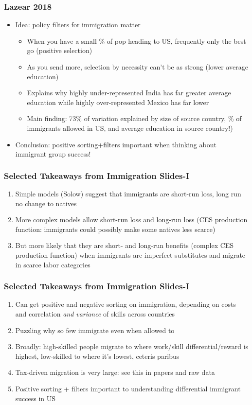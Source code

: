 \documentclass{beamer}
\begin{document}
\begin{frame}
\frametitle{Lazear 2018}
\begin{itemize}
\item Idea: policy filters for immigration matter 
\bigskip
\begin{itemize}
\item When you have a small \% of pop heading to US, frequently only the best go (positive selection)
\bigskip
\item As you send more, selection by necessity can't be as strong (lower average education)
\bigskip
\item Explains why highly under-represented India has far greater average education while highly over-represented Mexico has far lower 
\bigskip
\item Main finding: 73\% of variation explained by size of source country, \% of immigrants allowed in US, and average education in source country!)
\end{itemize}
\item Conclusion:  positive sorting+filters important when thinking about immigrant group success!
\end{itemize}
\end{frame}




\begin{frame}
\frametitle{Selected Takeaways from Immigration Slides-I}
\begin{enumerate}
\item Simple models (Solow) suggest that immigrants are short-run loss, long run no change to natives
\item More complex models allow short-run loss and long-run loss (CES production function: immigrants could possibly make some natives less scarce)
\item But more likely that they are short- and long-run benefits (complex CES production function) when immigrants are imperfect substitutes and migrate in scarce labor categories
\end{enumerate}
\end{frame}

\begin{frame}
\frametitle{Selected Takeaways from Immigration Slides-I}
\begin{enumerate}
\item Can get positive and negative sorting on immigration, depending on costs and correlation \emph{and variance} of skills across countries
\item Puzzling why so few immigrate even when allowed to
\item Broadly: high-skilled people migrate to where work/skill differential/reward is highest, low-skilled to where it's lowest, ceteris paribus
\item Tax-driven migration is very large: see this in papers and raw data
\item Positive sorting + filters important to understanding differential immigrant success in US
\end{enumerate}
\end{frame}
\end{document}
